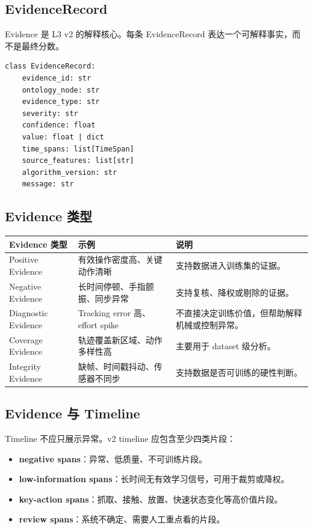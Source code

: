 \documentclass[UTF8,zihao=-4,oneside,openany]{ctexrep}
\newcommand{\Term}[1]{\textbf{#1}}
\begin{document}
\subsection{EvidenceRecord}

Evidence 是 L3 v2 的解释核心。每条 EvidenceRecord 表达一个可解释事实，而不是最终分数。

\begin{verbatim}
class EvidenceRecord:
    evidence_id: str
    ontology_node: str
    evidence_type: str
    severity: str
    confidence: float
    value: float | dict
    time_spans: list[TimeSpan]
    source_features: list[str]
    algorithm_version: str
    message: str
\end{verbatim}

\subsection{Evidence 类型}

\begin{longtable}{L{3.5cm} L{4cm} L{6.5cm}}
\toprule
Evidence 类型 & 示例 & 说明 \\
\midrule
Positive Evidence & 有效操作密度高、关键动作清晰 & 支持数据进入训练集的证据。 \\
Negative Evidence & 长时间停顿、手指颤振、同步异常 & 支持复核、降权或剔除的证据。 \\
Diagnostic Evidence & Tracking error 高、effort spike & 不直接决定训练价值，但帮助解释机械或控制异常。 \\
Coverage Evidence & 轨迹覆盖新区域、动作多样性高 & 主要用于 dataset 级分析。 \\
Integrity Evidence & 缺帧、时间戳抖动、传感器不同步 & 支持数据是否可训练的硬性判断。 \\
\bottomrule
\end{longtable}

\subsection{Evidence 与 Timeline}

Timeline 不应只展示异常。v2 timeline 应包含至少四类片段：

\begin{itemize}
\item \Term{negative spans}：异常、低质量、不可训练片段。
\item \Term{low-information spans}：长时间无有效学习信号，可用于裁剪或降权。
\item \Term{key-action spans}：抓取、接触、放置、快速状态变化等高价值片段。
\item \Term{review spans}：系统不确定、需要人工重点看的片段。
\end{itemize}
\end{document}
